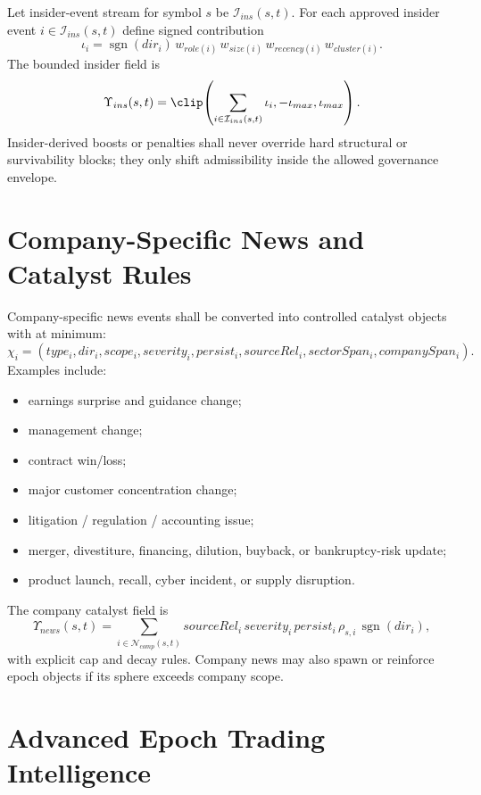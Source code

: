 Let insider-event stream for symbol $s$ be $\mathcal{I}_{ins}(s,t)$. For each approved insider event $i\in\mathcal{I}_{ins}(s,t)$ define signed contribution
\[
\iota_i = \operatorname{sgn}(dir_i)\,w_{role(i)}\,w_{size(i)}\,w_{recency(i)}\,w_{cluster(i)}.
\]
The bounded insider field is
\[
\Upsilon_{ins}(s,t)=\clip\!\left(\sum_{i\in\mathcal{I}_{ins}(s,t)} \iota_i,-\iota_{max},\iota_{max}\right).
\]
Insider-derived boosts or penalties shall never override hard structural or survivability blocks; they only shift admissibility inside the allowed governance envelope.

\section{Company-Specific News and Catalyst Rules}

Company-specific news events shall be converted into controlled catalyst objects with at minimum:
\[
\chi_i=(type_i,dir_i,scope_i,severity_i,persist_i,sourceRel_i,sectorSpan_i,companySpan_i).
\]
Examples include:
\begin{itemize}
    \item earnings surprise and guidance change;
    \item management change;
    \item contract win/loss;
    \item major customer concentration change;
    \item litigation / regulation / accounting issue;
    \item merger, divestiture, financing, dilution, buyback, or bankruptcy-risk update;
    \item product launch, recall, cyber incident, or supply disruption.
\end{itemize}
The company catalyst field is
\[
\Upsilon_{news}(s,t)=\sum_{i\in\mathcal{N}_{comp}(s,t)} sourceRel_i\,severity_i\,persist_i\,\rho_{s,i}\,\operatorname{sgn}(dir_i),
\]
with explicit cap and decay rules. Company news may also spawn or reinforce epoch objects if its sphere exceeds company scope.

\section{Advanced Epoch Trading Intelligence}

